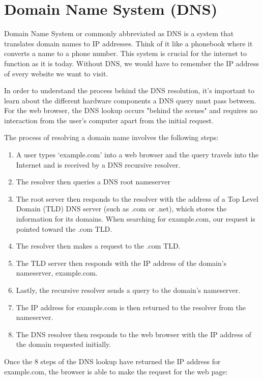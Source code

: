 \documentclass[12pt,titlepage]{article}
\begin{document}
\section{Domain Name System (DNS)}
Domain Name System or commonly abbreviated as DNS is a system that translates domain names to IP addresses.
Think of it like a phonebook where it converts a name to a phone number. This system is crucial for the internet
to function as it is today. Without DNS, we would have to remember the IP address of every website we want to visit.

In order to understand the process behind the DNS resolution, it’s important to learn about
the different hardware components a DNS query must pass between. For the web browser, the DNS
lookup occurs "behind the scenes" and requires no interaction from the user’s computer apart from
the initial request.

The process of resolving a domain name involves the following steps:
\begin{enumerate}
    \item {
        A user types ‘example.com’ into a web browser and the query travels into the Internet and is received by a DNS recursive resolver.
    }
    \item {
        The resolver then queries a DNS root nameserver
    }
    \item {
        The root server then responds to the resolver with the address of a Top Level Domain (TLD) DNS
        server (such as .com or .net), which stores the information for its domains. When searching for
        example.com, our request is pointed toward the .com TLD.
    }
    \item {
        The resolver then makes a request to the .com TLD.
    }
    \item {
        The TLD server then responds with the IP address of the domain’s nameserver, example.com.
    }
    \item {
        Lastly, the recursive resolver sends a query to the domain’s nameserver.
    }
    \item {
        The IP address for example.com is then returned to the resolver from the nameserver.
    }
    \item {
        The DNS resolver then responds to the web browser with the IP address of the domain requested initially.
    }
\end{enumerate}

Once the 8 steps of the DNS lookup have returned the IP address for example.com, the browser is able to make the request for the web page:
\end{document}
